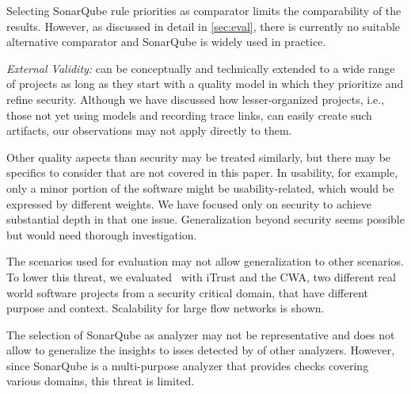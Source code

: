 	Selecting SonarQube rule priorities as comparator limits the comparability of the results. However, as discussed in detail in \autoref{sec:eval}, there is currently no suitable alternative comparator and SonarQube is widely used in practice.

\textit{External Validity:}
%
\appr{} can be conceptually and technically extended to a wide range of projects as long as they start with a quality model in which they prioritize and refine security.
Although we have discussed how lesser-organized projects, i.e., those not yet using models and recording trace links, can easily create such artifacts, our observations may not apply directly to them.

Other quality aspects than security may be treated similarly, but there may be specifics to consider that are not covered in this paper.
In usability, for example, only a minor portion of the software might be usability-related, which would be expressed by different weights.
We have focused only on security to achieve substantial depth in that one issue.
Generalization beyond security seems possible but would need thorough investigation.

The scenarios used for evaluation may not allow generalization to other scenarios.
To lower this threat, we evaluated \appr\ with iTrust and the CWA, two different real world software projects from a security critical domain, that have different purpose and context.
Scalability for large flow networks is shown.

	The selection of SonarQube as analyzer may not be representative and does not allow to generalize the insights to isses detected by of other analyzers.
	However, since SonarQube is a multi-purpose analyzer that provides checks covering various domains, this threat is limited.

